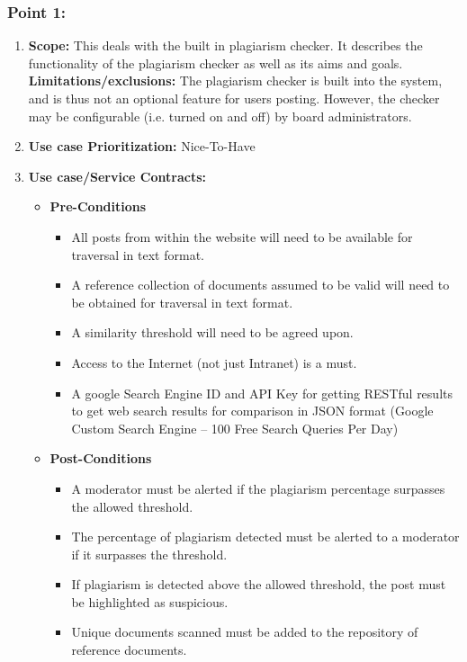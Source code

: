 \documentclass[11pt]{article}
\begin{document}
\subsubsection{Point 1: }
\begin{enumerate}
\item \textbf{Scope: }
This deals with the built in plagiarism checker. It describes the functionality of the plagiarism checker as well as its aims and goals.
\newline
\textbf{Limitations/exclusions:} 
The plagiarism checker is built into the system, and is thus not an optional feature for users posting. However, the checker may be configurable (i.e. turned on and off) by board administrators.
\item 	\textbf{Use case Prioritization: } Nice-To-Have
\item 	\textbf{Use case/Service Contracts: }
		\begin{itemize}
			\item	\textbf{Pre-Conditions}
			\begin{itemize}
	  			\item All posts from within the website will need to be available for traversal in text format.
	  			\item A reference collection of documents assumed to be valid will need to be obtained for traversal in text format.
	  			\item A similarity threshold will need to be agreed upon.
	  			\item Access to the Internet (not just Intranet) is a must.
	  			\item A google Search Engine ID and API Key for getting RESTful results to get web search results for comparison in JSON format (Google Custom Search Engine – 100 Free Search Queries Per Day)
	  		\end{itemize}
	  		\item	\textbf{Post-Conditions}
	  		\begin{itemize}
	  			\item A moderator must be alerted if the plagiarism percentage surpasses the allowed threshold.
	  			\item The percentage of plagiarism detected must be alerted to a moderator if it surpasses the threshold.
	  			\item If plagiarism is detected above the allowed threshold, the post must be highlighted as suspicious.
	  			\item Unique documents scanned must be added to the repository of reference documents.

\end{itemize}
\end{itemize}
\end{enumerate}
\end{document}
